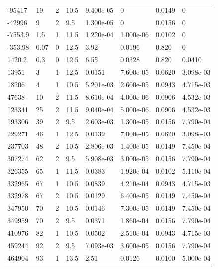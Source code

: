 \documentclass[preview]{standalone}
\begin{document}
{{\begin{tabular}{L{1.2cm}C{1.2cm} C{0.3cm}C{0.5cm} C{1.4cm}C{1.4cm} C{1.4cm}C{1.4cm}}
  -95417  &    19  & 2     & 10.5 &  9.400e-05  & 0  & 0.0149 &  0   \\ 
  -42996  &     9  & 2     & 9.5 &  1.300e-05  & 0  & 0.0156 &  0   \\ 
  -7553.9  &   1.5  & 1     & 11.5 &  1.220e-04  & 1.000e-06  & 0.0102 &  0   \\ 
  -353.98  &  0.07  & 0     & 12.5 &  3.92  & 0.0196  & 0.820 &  0   \\ 
  1420.2  &   0.3  & 0     & 12.5 &  6.55  & 0.0328  & 0.820 &  0.0410   \\ 
  13951  &     3  & 1     & 12.5 &  0.0151  & 7.600e-05  & 0.0620 &  3.098e-03   \\ 
  18206  &     4  & 1     & 10.5 &  5.201e-03  & 2.600e-05  & 0.0943 &  4.715e-03   \\ 
  47638  &    10  & 2     & 11.5 &  8.610e-04  & 4.000e-06  & 0.0906 &  4.532e-03   \\ 
  123341  &    25  & 2     & 11.5 &  9.040e-04  & 5.000e-06  & 0.0906 &  4.532e-03   \\ 
  193306  &    39  & 2     & 9.5 &  2.603e-03  & 1.300e-05  & 0.0156 &  7.790e-04   \\ 
  229271  &    46  & 1     & 12.5 &  0.0139  & 7.000e-05  & 0.0620 &  3.098e-03   \\ 
  237703  &    48  & 2     & 10.5 &  2.806e-03  & 1.400e-05  & 0.0149 &  7.450e-04   \\ 
  307274  &    62  & 2     & 9.5 &  5.908e-03  & 3.000e-05  & 0.0156 &  7.790e-04   \\ 
  326355  &    65  & 1     & 11.5 &  0.0383  & 1.920e-04  & 0.0102 &  5.110e-04   \\ 
  332965  &    67  & 1     & 10.5 &  0.0839  & 4.210e-04  & 0.0943 &  4.715e-03   \\ 
  332978  &    67  & 2     & 10.5 &  0.0129  & 6.400e-05  & 0.0149 &  7.450e-04   \\ 
  347950  &    70  & 2     & 10.5 &  0.0146  & 7.300e-05  & 0.0149 &  7.450e-04   \\ 
  349959  &    70  & 2     & 9.5 &  0.0371  & 1.860e-04  & 0.0156 &  7.790e-04   \\ 
  410976  &    82  & 1     & 10.5 &  0.0502  & 2.510e-04  & 0.0943 &  4.715e-03   \\ 
  459244  &    92  & 2     & 9.5 &  7.093e-03  & 3.600e-05  & 0.0156 &  7.790e-04   \\ 
  464904  &    93  & 1     & 13.5 &  2.51  & 0.0126  & 0.0100 &  5.000e-04   \\ 

\end{tabular}}}
\end{document}
